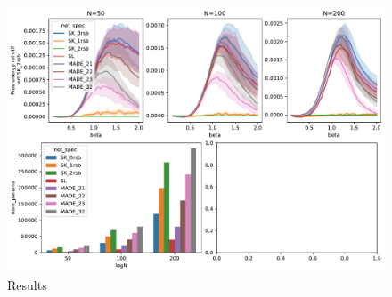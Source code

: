 \documentclass[aps,physrev,10pt,floatfix,longbibliography,nofootinbib,reprint]{revtex4-2}
\begin{document}
\begin{figure}[!h]
    \centering 
    \includegraphics[width=1\textwidth]{img/SK_res.pdf}
    \caption{Results}
    \label{fig:curie_weiss}
\end{figure}
\end{document}
